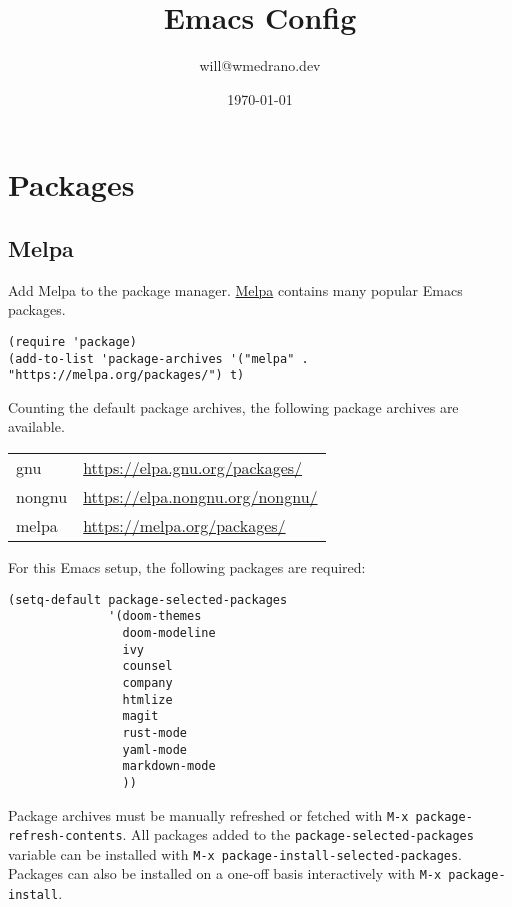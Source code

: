 \documentclass[11pt]{article}
\author{will@wmedrano.dev}
\date{\today}
\title{Emacs Config}
\begin{document}
\maketitle
\tableofcontents

\section{Packages}
\label{sec:org178fe0e}

\subsection{Melpa}
\label{sec:orgfd9ba64}

Add Melpa to the package manager. \href{https://melpa.org}{Melpa} contains many popular Emacs packages.

\begin{verbatim}
(require 'package)
(add-to-list 'package-archives '("melpa" . "https://melpa.org/packages/") t)
\end{verbatim}

Counting the default package archives, the following package archives are
available.

\begin{center}
\begin{tabular}{ll}
gnu & \url{https://elpa.gnu.org/packages/}\\
nongnu & \url{https://elpa.nongnu.org/nongnu/}\\
melpa & \url{https://melpa.org/packages/}\\
\end{tabular}
\end{center}

For this Emacs setup, the following packages are required:

\begin{verbatim}
(setq-default package-selected-packages
              '(doom-themes
                doom-modeline
                ivy
                counsel
                company
                htmlize
                magit
                rust-mode
                yaml-mode
                markdown-mode
                ))
\end{verbatim}

Package archives must be manually refreshed or fetched with \texttt{M-x
package-refresh-contents}. All packages added to the \texttt{package-selected-packages}
variable can be installed with \texttt{M-x package-install-selected-packages}. Packages
can also be installed on a one-off basis interactively with \texttt{M-x
package-install}.
\end{document}
